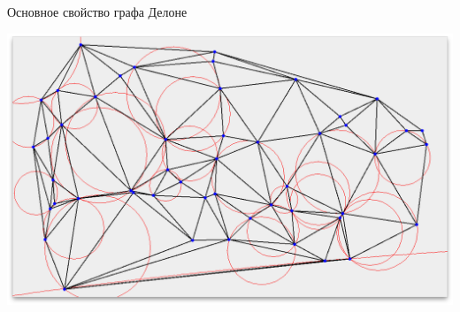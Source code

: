 \documentclass[14pt, fleqn, xcolor={dvipsnames, table}]{beamer}
\begin{document}
        \begin{frame}{Основное свойство графа Делоне}
            \begin{center}
	            \includegraphics[scale=0.295]{voronoi-4.png}
	        \end{center}       
        \end{frame}
        
\end{document}
